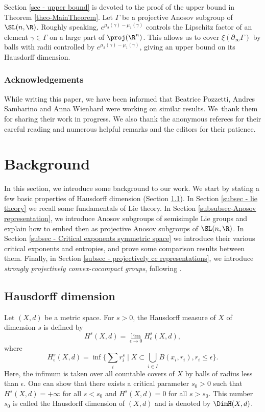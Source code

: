 Section \ref{sec - upper bound} is devoted to the proof of the upper bound in Theorem \ref{theo-MainTheorem}. Let $\Gamma$ be a projective Anosov subgroup of $\SL(n,\R)$. Roughly speaking, $e^{\mu_2(\gamma)-\mu_1(\gamma)}$ controls the Lipschitz factor of an element $\gamma \in \Gamma$ on a large part of $\proj(\R^n)$. This allows us to cover $\xi(\partial_\infty \Gamma)$ by balls with radii controlled by $e^{\mu_2(\gamma)-\mu_1(\gamma)}$, giving an upper bound on its Hausdorff dimension.

\subsubsection*{Acknowledgements}
While writing this paper, we have been informed that Beatrice Pozzetti, Andres Sambarino and Anna Wienhard were working on similar results. We~thank them for sharing their work in progress. We also thank the anonymous referees for their careful reading and numerous helpful remarks and the editors for their patience.

\section{Background} \label{sec - Background}

In this section, we introduce some background to our work. We start by stating a few basic properties of Hausdorff dimension (Section \ref{subsec - hausdorff dimension}). In Section \ref{subsec - lie theory} we recall some fundamentals of Lie theory. In Section \ref{subsubsec-Anosov representation}, we introduce Anosov subgroups of semisimple Lie groups and explain how to embed then as projective Anosov subgroups of $\SL(n,\R)$. In Section \ref{subsec - Critical exponents symmetric space} we introduce their various critical exponents and entropies, and prove some comparison results between them. Finally, in Section \ref{subsec - projectively cc representations}, we introduce \emph{strongly projectively convex-cocompact groups}, following \cite{DGK}.

\subsection{Hausdorff dimension} \label{subsec - hausdorff dimension}

Let $(X,d)$ be a metric space. For $s>0$, the Hausdorff measure of $X$ of dimension $s$ is defined by\vspace*{-3pt}
\[H^s(X,d) = \lim_{\epsilon\to 0} H^s_\epsilon(X,d),\]
where\vspace*{-3pt}
\[\textstyle
H^s_\epsilon(X,d) = \inf \bigl\{ \sum_i r_i^s \mid X \subset \bigcup_{i\in I} B(x_i, r_i), r_i \leq \epsilon\bigr\}.\]
Here, the infimum is taken over all countable covers of $X$ by balls of radius less than $\epsilon$.
One can show that there exists a critical parameter $s_0>0$ such that $H^s(X,d) = +\infty$ for all $s<s_0$ and $H^s(X,d) = 0$ for all $s>s_0$. This number $s_0$ is called the Hausdorff dimension of $(X,d)$ and is denoted by $\DimH(X,d)$.

